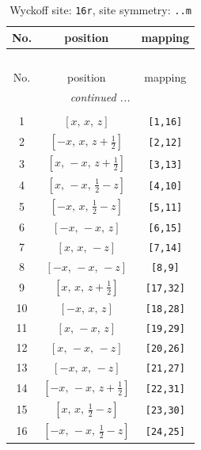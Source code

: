 \documentclass[fleqn,8pt]{jsarticle}
\begin{document}
\renewcommand{\arraystretch}{1.2}
\begin{longtable}{ccc}
\caption{Wyckoff site: {\tt 16r}, site symmetry: {\tt ..m}}
 \\
 \hline \hline
No. & position & mapping \\ \hline \endfirsthead

\multicolumn{2}{l}{\tablename\ \thetable{}} \\
 \hline \hline
No. & position & mapping \\ \hline \endhead

 \hline \hline
\multicolumn{2}{r}{\footnotesize\it continued ...} \\ \endfoot

 \hline \hline
\multicolumn{2}{r}{} \\ \endlastfoot

1 & $\left[ x,\, x,\, z \right]$ & {\tt [1,16]} \\ \hline
2 & $\left[ - x,\, x,\, z + \frac{1}{2} \right]$ & {\tt [2,12]} \\ \hline
3 & $\left[ x,\, - x,\, z + \frac{1}{2} \right]$ & {\tt [3,13]} \\ \hline
4 & $\left[ x,\, - x,\, \frac{1}{2} - z \right]$ & {\tt [4,10]} \\ \hline
5 & $\left[ - x,\, x,\, \frac{1}{2} - z \right]$ & {\tt [5,11]} \\ \hline
6 & $\left[ - x,\, - x,\, z \right]$ & {\tt [6,15]} \\ \hline
7 & $\left[ x,\, x,\, - z \right]$ & {\tt [7,14]} \\ \hline
8 & $\left[ - x,\, - x,\, - z \right]$ & {\tt [8,9]} \\ \hline
9 & $\left[ x,\, x,\, z + \frac{1}{2} \right]$ & {\tt [17,32]} \\ \hline
10 & $\left[ - x,\, x,\, z \right]$ & {\tt [18,28]} \\ \hline
11 & $\left[ x,\, - x,\, z \right]$ & {\tt [19,29]} \\ \hline
12 & $\left[ x,\, - x,\, - z \right]$ & {\tt [20,26]} \\ \hline
13 & $\left[ - x,\, x,\, - z \right]$ & {\tt [21,27]} \\ \hline
14 & $\left[ - x,\, - x,\, z + \frac{1}{2} \right]$ & {\tt [22,31]} \\ \hline
15 & $\left[ x,\, x,\, \frac{1}{2} - z \right]$ & {\tt [23,30]} \\ \hline
16 & $\left[ - x,\, - x,\, \frac{1}{2} - z \right]$ & {\tt [24,25]} \\
\end{longtable}
\end{document}
